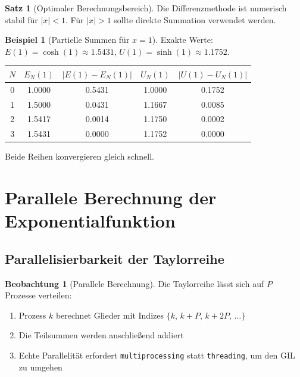 ﻿\documentclass[a4paper,12pt]{article}
\theoremstyle{definition}
\newtheorem{beispiel}{Beispiel}
\newtheorem{satz}{Satz}
\newtheorem{beobachtung}{Beobachtung}
\begin{document}
\begin{satz}[Optimaler Berechnungsbereich]
Die Differenzmethode ist numerisch stabil für $|x| < 1$. Für $|x| > 1$
sollte direkte Summation verwendet werden.
\end{satz}

\begin{beispiel}[Partielle Summen für $x=1$]
Exakte Werte: $E(1) = \cosh(1) \approx 1.5431$,
$U(1) = \sinh(1) \approx 1.1752$.

\begin{center}
\begin{tabular}{c|c|c|c|c}
  $N$ & $E_N(1)$ & $|E(1)-E_N(1)|$ & $U_N(1)$ & $|U(1)-U_N(1)|$ \\
  \hline
  0 & 1.0000 & 0.5431 & 1.0000 & 0.1752 \\
  1 & 1.5000 & 0.0431 & 1.1667 & 0.0085 \\
  2 & 1.5417 & 0.0014 & 1.1750 & 0.0002 \\
  3 & 1.5431 & 0.0000 & 1.1752 & 0.0000 \\
\end{tabular}
\end{center}
Beide Reihen konvergieren gleich schnell.
\end{beispiel}

\section{Parallele Berechnung der Exponentialfunktion}

\subsection{Parallelisierbarkeit der Taylorreihe}

\begin{beobachtung}[Parallele Berechnung]
Die Taylorreihe lässt sich auf $P$ Prozesse verteilen:
\begin{enumerate}
  \item Prozess $k$ berechnet Glieder mit Indizes
        $\{k,\, k+P,\, k+2P,\, \ldots\}$
  \item Die Teilsummen werden anschließend addiert
  \item Echte Parallelität erfordert \texttt{multiprocessing} statt
        \texttt{threading}, um den GIL zu umgehen
\end{enumerate}
\end{beobachtung}
\end{document}
